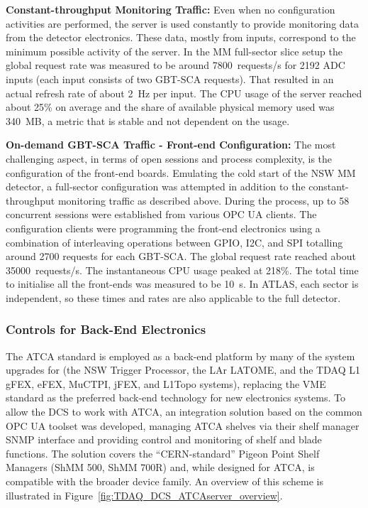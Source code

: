 \documentclass[cernpreprint, atlasdraft=false, UKenglish,british,orcidlogo, texmf, orcidlogo]{atlasdoc}
\begin{document}
\textbf{Constant-throughput Monitoring Traffic:} Even when no configuration activities are performed, the server is used constantly to provide monitoring data from the detector electronics. These data, mostly from \analog inputs, correspond to the minimum possible activity of the server. In the \gls{MM} full-sector slice setup the global request rate was measured to be around \SI{7800}{requests/\s} for \num{2192} \gls{ADC} inputs (each \analog input consists of two \gls{GBT-SCA} requests). That resulted in an actual refresh rate of about \SI{2}{\Hz} per \analog input. The CPU usage of the server reached about 25\% on average and the share of available physical memory used was \SI{340}{MB}, a metric that is stable and not dependent on the usage.
 
\textbf{On-demand  \gls{GBT-SCA} Traffic - Front-end Configuration:} The most challenging aspect, in terms of open sessions and process complexity, is the configuration of the front-end boards. Emulating the cold start of the  \gls{NSW} \gls{MM} detector, a full-sector configuration was attempted in addition to the constant-throughput monitoring traffic as described above. During the process, up to \num{58} concurrent sessions were established from various \gls{OPC UA}  clients. The configuration clients were programming the front-end electronics using a combination of interleaving operations between \gls{GPIO}, \gls{I2C}, and \gls{SPI} totalling around \num{2700} requests for each \gls{GBT-SCA}. The global request rate reached about \SI{35000}{requests/\s}. The instantaneous CPU usage peaked at 218\%. The total time to initialise all the front-ends was measured to be \SI{10}{\s}. In ATLAS, each sector is independent, so these times and rates are also applicable to the full detector.
 
\subsubsection{Controls for  Back-End Electronics}
\label{sec:TDAQ_DCS_ATCA}
 
The \gls{ATCA} standard is employed as a back-end platform by many of the system upgrades for \RunThr (the \gls{NSW} Trigger Processor, the \gls{LAr} \gls{LATOME}, and the \gls{TDAQ} \gls{L1} \gls{gFEX}, \gls{eFEX}, \gls{MuCTPI}, \gls{jFEX}, and \gls{L1Topo} systems), replacing the \gls{VME} standard as the preferred back-end technology for new electronics systems. To allow the \gls{DCS} to work with \gls{ATCA}, an integration solution based on the common \gls{OPC UA}  toolset was developed, managing \gls{ATCA} shelves via their shelf manager \gls{SNMP} interface and providing control and monitoring of shelf and blade functions. The solution covers the “CERN-standard” Pigeon Point Shelf Managers (ShMM 500, ShMM 700R) and, while designed for \gls{ATCA}, is compatible with the broader device family. An overview of this scheme is illustrated in Figure~\ref{fig:TDAQ_DCS_ATCAserver_overview}.
 
\end{document}

